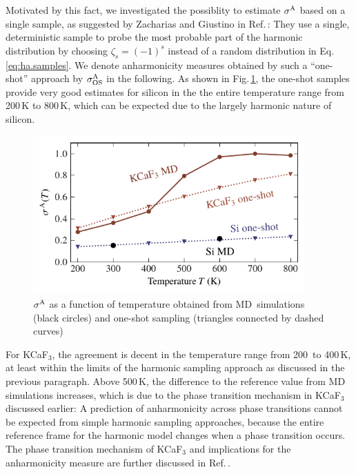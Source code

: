 Motivated by this fact, we investigated the possiblity to estimate $\sigma^\mathrm{A}$ based on a single sample, as suggested by Zacharias and Giustino in Ref.\,\cite{Zacharias.2016}: They use a single, deterministic sample to probe the most probable part of the harmonic distribution by choosing $\zeta_s = (-1)^s$ instead of a random distribution in Eq.\,\eqref{eq:ha.samples}. We denote anharmonicity measures obtained by such a ``one-shot'' approach by $\sigma^\mathrm{A}_\mathrm{OS}$ in the following. As shown in Fig.\,\ref{fig:anh.one-shot}, the one-shot samples provide very good estimates for silicon in the the entire temperature range from 200\,K to 800\,K, which can be expected due to the largely harmonic nature of silicon.
\begin{figure}
	\includegraphics[width=4.1in]{./data/plots/anharmonicity/7_sampling/sigma_temp_one_shot.pdf}
	\caption{
		$\sigma^\mathrm{A}$ as a function of temperature obtained from MD~simulations (black circles) and one-shot sampling (triangles connected by dashed curves)
	}
	\label{fig:anh.one-shot}
\end{figure}
For KCaF$_3$, the agreement is decent in the temperature range from 200\, to 400\,K, at least within the limits of the harmonic sampling approach as discussed in the previous paragraph. Above 500\,K, the difference to the reference value from MD simulations increases, which is due to the phase transition mechanism in KCaF$_3$ discussed earlier:
A prediction of anharmonicity across phase transitions cannot be expected from simple harmonic sampling approaches, because the entire reference frame for the harmonic model changes when a phase transition occurs. The phase transition mechanism of KCaF$_3$ and implications for the anharmonicity measure are further discussed in Ref.\,\cite{Knoop.2020}.

